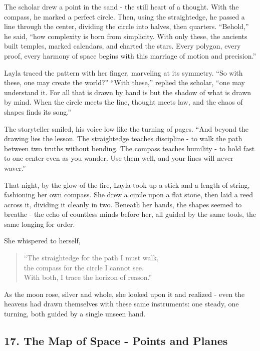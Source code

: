 \documentclass[
  letterpaper,
  DIV=11,
  numbers=noendperiod]{scrreprt}
\begin{document}
The scholar drew a point in the sand - the still heart of a thought.
With the compass, he marked a perfect circle. Then, using the
straightedge, he passed a line through the center, dividing the circle
into halves, then quarters. ``Behold,'' he said, ``how complexity is
born from simplicity. With only these, the ancients built temples,
marked calendars, and charted the stars. Every polygon, every proof,
every harmony of space begins with this marriage of motion and
precision.''

Layla traced the pattern with her finger, marveling at its symmetry.
``So with these, one may create the world?'' ``With these,'' replied the
scholar, ``one may understand it. For all that is drawn by hand is but
the shadow of what is drawn by mind. When the circle meets the line,
thought meets law, and the chaos of shapes finds its song.''

The storyteller smiled, his voice low like the turning of pages. ``And
beyond the drawing lies the lesson. The straightedge teaches discipline
- to walk the path between two truths without bending. The compass
teaches humility - to hold fast to one center even as you wander. Use
them well, and your lines will never waver.''

That night, by the glow of the fire, Layla took up a stick and a length
of string, fashioning her own compass. She drew a circle upon a flat
stone, then laid a reed across it, dividing it cleanly in two. Beneath
her hands, the shapes seemed to breathe - the echo of countless minds
before her, all guided by the same tools, the same longing for order.

She whispered to herself,

\begin{quote}
``The straightedge for the path I must walk,\\
the compass for the circle I cannot see.\\
With both, I trace the horizon of reason.''
\end{quote}

As the moon rose, silver and whole, she looked upon it and realized -
even the heavens had drawn themselves with these same instruments: one
steady, one turning, both guided by a single unseen hand.

\subsection{17. The Map of Space - Points and
Planes}\label{the-map-of-space---points-and-planes}
\end{document}
